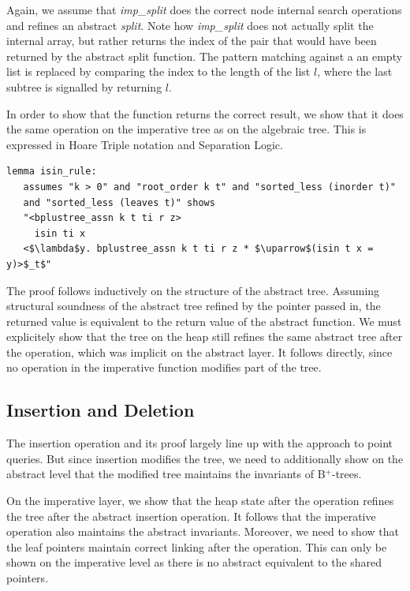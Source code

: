 \documentclass[a4paper,UKenglish,cleveref, autoref, thm-restate]{lipics-v2021}
\newcommand{\btrees}{B$^+$-trees}
\begin{document}
Again, we assume that \emph{imp\_split} does the correct node internal search operations
and refines an abstract \emph{split}.
Note how \emph{imp\_split} does not actually split
the internal array, but rather returns the index of the pair
that would have been returned by the abstract split function.
The pattern matching against a an empty list
is replaced by comparing the index to the length of the list $l$,
where the last subtree is signalled by returning $l$.

In order to show that the function returns the correct result,
we show that it does the same operation on the imperative tree
as on the algebraic tree.
This is expressed in Hoare Triple notation and Separation Logic.

\begin{lstlisting}[mathescape=true, language=Isabelle,label=lst:isin-refines]
lemma isin_rule:
   assumes "k > 0" and "root_order k t" and "sorted_less (inorder t)"
   and "sorted_less (leaves t)" shows
   "<bplustree_assn k t ti r z>
     isin ti x
   <$\lambda$y. bplustree_assn k t ti r z * $\uparrow$(isin t x = y)>$_t$"
\end{lstlisting}

The proof follows inductively on the structure of the abstract tree.
Assuming structural soundness of the abstract tree refined by the pointer passed in,
the returned value is equivalent to the return value of the abstract function.
We must explicitely show that the tree on the heap
still refines the same abstract tree after the operation,
which was implicit on the abstract layer.
It follows directly, since no operation in the imperative
function modifies part of the tree.

\subsection{Insertion and Deletion}
\label{sec:insert_delete}

The insertion operation and its proof largely line up with the approach to point queries.
But since insertion modifies the tree,
we need to additionally show on the abstract level that the modified tree
maintains the invariants of \btrees.

On the imperative layer, we show that the heap state
after the operation refines the tree
after the abstract insertion operation.
It follows that the imperative operation
also maintains the abstract invariants.
Moreover, we need to show that the leaf pointers
maintain correct linking after the operation.
This can only be shown on the imperative level as there is no abstract equivalent
to the shared pointers.
\end{document}
